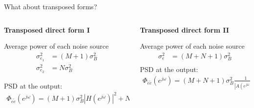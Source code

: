 \documentclass[10pt, handout]{beamer}
\begin{document}
\begin{frame}{What about transposed forms?}
	\begin{columns}[t]
		\begin{column}{0.5\textwidth}
			\textbf{Transposed direct form I}
			\begin{center}
				\resizebox{1.2\textwidth}{!}{}
			\end{center}
			Average power of each noise source
			\onslide<3|handout:0> {
			\begin{align*}
				\sigma_{e_1}^2 &= (M+1)\sigma_B^2 \\
				\sigma_{e_2}^2 &= N\sigma_B^2
			\end{align*}
			}
			
			PSD at the output:
			\onslide<3|handout:0> {
			\begin{align*}
				\Phi_{\tilde{e}\tilde{e}}(e^{j\omega}) = (M+1)\sigma_B^2|H(e^{j\omega})|^2 + N\sigma_B^2
			\end{align*}
			}
		
		\end{column}
		\begin{column}{0.5\textwidth}
			\textbf{Transposed direct form II}
			\vspace{-0.07cm}
			\begin{center}
				\resizebox{\textwidth}{!}{}
			\end{center}
			Average power of each noise source
			\onslide<3|handout:0> {
				\begin{align*}
				\sigma_{e}^2 &= (M+N+1)\sigma_B^2 \\
				\end{align*}
				\vspace{-0.2cm}
			}
			PSD at the output:
			\onslide<3|handout:0> {
				\begin{align*}
				\Phi_{\tilde{e}\tilde{e}}(e^{j\omega}) = (M+N+1)\sigma_B^2\frac{1}{|A(e^{j\omega})|^2}
				\end{align*}
			}
		\end{column}
	\end{columns}
\end{frame}
\end{document}
